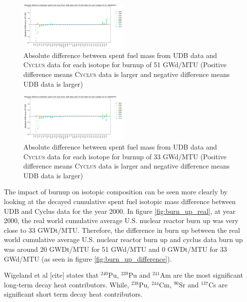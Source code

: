 \documentclass{anstrans}
\newcommand{\Cyclus}{\textsc{Cyclus}\xspace}%
\begin{document}
\begin{figure}[h] %
	\centering
	\includegraphics[width=0.48\textwidth]{absolute_diff_all_51}
	\caption{Absolute difference between spent fuel mass from UDB data and \Cyclus data for each isotope for burnup of 51 GWd/MTU (Positive difference means \Cyclus data is larger and negative difference means UDB data is larger)}
	\label{fig:absolute_diff_all_51}
\end{figure} 

\begin{figure}[h] %
	\centering
	\includegraphics[width=0.48\textwidth]{absolute_diff_all_33}
	\caption{Absolute difference between spent fuel mass from UDB data and \Cyclus data for each isotope for burnup of 33 GWd/MTU (Positive difference means \Cyclus data is larger and negative difference means UDB data is larger)}
	\label{fig:absolute_diff_all_33}
\end{figure} 

The impact of burnup on isotopic composition can be seen more clearly by looking at the decayed cumulative spent fuel isotopic mass difference between UDB and Cyclus data for the year 2000. In figure \ref{fig:burn_up_real}, at year 2000, the real world cumulative average U.S. nuclear reactor burn up was very close to 33 GWDt/MTU. Therefore, the difference in burn up between the real world cumulative average U.S. nuclear reactor burn up and cyclus data burn up was around 20 GWDt/MTU for 51 GWd/MTU and 0 GWDt/MTU for 33 GWd/MTU (as seen in figure \ref{fig:burn_up_difference}). 

Wigeland et al [cite] states that $^{240}$Pu, $^{239}$Pu and $^{241}$Am are the most significant long-term decay heat contributors. While, $^{238}$Pu, $^{244}$Cm, $^{90}$Sr and $^{137}$Cs are significant short term decay heat contributors. 
\end{document}
